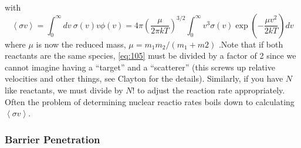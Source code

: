 \documentclass[10pt]{article}
\numberwithin{equation}{section}
\newcommand{\avg}[1]{\left\langle#1\right\rangle}
\begin{document}
  with
  \begin{equation}
    \label{eq:108}
    \avg{\sigma v}=\int_0^\infty dv\
    \sigma(v)v\phi(v)=4\pi\left(\frac{\mu}{2\pi kT}\right)^{3/2}
    \int_0^\infty v^3\sigma(v)\exp\left(-\frac{\mu v^2}{2kT}\right)dv
  \end{equation}
  where $\mu$ is now the reduced mass, $\mu=m_1m_2/(m_1+m2)$ .Note that
  if both reactants are the same species, \eqref{eq:105}
  must be divided by a factor of 2 since we cannot imagine having a
  ``target'' and a ``scatterer'' (this screws up relative velocities
  and other things, see Clayton for the details). Similarly, if you
  have $N$ like reactants, we must divide by $N!$ to adjust the
  reaction rate appropriately. Often the problem of determining
  nuclear reactio rates boils down to calculating $\avg{\sigma v}$.

  \subsubsection{Barrier Penetration}
  \label{sec:barrier-penetration}
\end{document}
